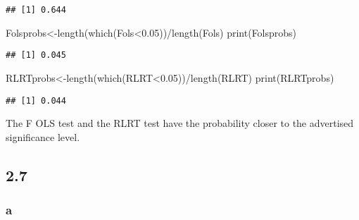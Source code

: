 \documentclass[
]{article}
\newenvironment{Shaded}{\begin{snugshade}}{\end{snugshade}}
\newcommand{\FloatTok}[1]{\textcolor[rgb]{0.00,0.00,0.81}{#1}}
\newcommand{\FunctionTok}[1]{\textcolor[rgb]{0.00,0.00,0.00}{#1}}
\newcommand{\NormalTok}[1]{#1}
\newcommand{\OtherTok}[1]{\textcolor[rgb]{0.56,0.35,0.01}{#1}}
\newcommand{\SpecialCharTok}[1]{\textcolor[rgb]{0.00,0.00,0.00}{#1}}
\begin{document}
\begin{verbatim}
## [1] 0.644
\end{verbatim}

\begin{Shaded}
\begin{Highlighting}[]
\NormalTok{Folsprobs}\OtherTok{\textless{}{-}}\FunctionTok{length}\NormalTok{(}\FunctionTok{which}\NormalTok{(Fols}\SpecialCharTok{\textless{}}\FloatTok{0.05}\NormalTok{))}\SpecialCharTok{/}\FunctionTok{length}\NormalTok{(Fols)}
\FunctionTok{print}\NormalTok{(Folsprobs)}
\end{Highlighting}
\end{Shaded}

\begin{verbatim}
## [1] 0.045
\end{verbatim}

\begin{Shaded}
\begin{Highlighting}[]
\NormalTok{RLRTprobs}\OtherTok{\textless{}{-}}\FunctionTok{length}\NormalTok{(}\FunctionTok{which}\NormalTok{(RLRT}\SpecialCharTok{\textless{}}\FloatTok{0.05}\NormalTok{))}\SpecialCharTok{/}\FunctionTok{length}\NormalTok{(RLRT)}
\FunctionTok{print}\NormalTok{(RLRTprobs)}
\end{Highlighting}
\end{Shaded}

\begin{verbatim}
## [1] 0.044
\end{verbatim}

The F OLS test and the RLRT test have the probability closer to the
advertised significance level.

\hypertarget{section-1}{%
\subsection{2.7}\label{section-1}}

\hypertarget{a-1}{%
\subsubsection{a}\label{a-1}}
\end{document}
